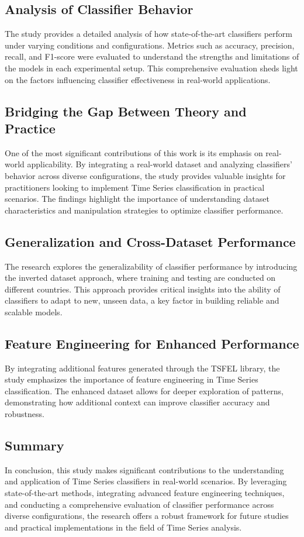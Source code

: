 \documentclass{ieeeaccess}
\begin{document}
\subsection{Analysis of Classifier Behavior}
The study provides a detailed analysis of how state-of-the-art classifiers perform under varying conditions and configurations. Metrics such as accuracy, precision, recall, and F1-score were evaluated to understand the strengths and limitations of the models in each experimental setup. This comprehensive evaluation sheds light on the factors influencing classifier effectiveness in real-world applications.

\subsection{Bridging the Gap Between Theory and Practice}
One of the most significant contributions of this work is its emphasis on real-world applicability. By integrating a real-world dataset and analyzing classifiers’ behavior across diverse configurations, the study provides valuable insights for practitioners looking to implement Time Series classification in practical scenarios. The findings highlight the importance of understanding dataset characteristics and manipulation strategies to optimize classifier performance.

\subsection{Generalization and Cross-Dataset Performance}
The research explores the generalizability of classifier performance by introducing the inverted dataset approach, where training and testing are conducted on different countries. This approach provides critical insights into the ability of classifiers to adapt to new, unseen data, a key factor in building reliable and scalable models.

\subsection{Feature Engineering for Enhanced Performance}
By integrating additional features generated through the TSFEL library, the study emphasizes the importance of feature engineering in Time Series classification. The enhanced dataset allows for deeper exploration of patterns, demonstrating how additional context can improve classifier accuracy and robustness.

\subsection*{Summary}
In conclusion, this study makes significant contributions to the understanding and application of Time Series classifiers in real-world scenarios. By leveraging state-of-the-art methods, integrating advanced feature engineering techniques, and conducting a comprehensive evaluation of classifier performance across diverse configurations, the research offers a robust framework for future studies and practical implementations in the field of Time Series analysis.
\end{document}
